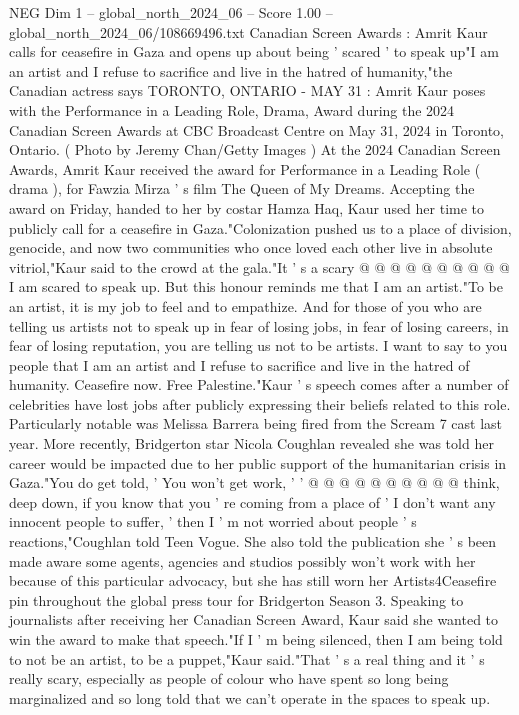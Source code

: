 \begin{textsample}{NEG Dim 1 – global\_north\_2024\_06 – Score 1.00 – global\_north\_2024\_06/108669496.txt}  \label{ex:f1_neg_140}
Canadian Screen Awards : Amrit Kaur calls for ceasefire in Gaza and opens up about being ' scared ' to speak up"I am an artist and I refuse to sacrifice and live in the hatred of humanity,"the Canadian actress says TORONTO, ONTARIO - MAY 31 : Amrit Kaur poses with the Performance in a Leading Role, Drama, Award during the 2024 Canadian Screen Awards at CBC Broadcast Centre on May 31, 2024 in Toronto, Ontario. ( Photo by Jeremy Chan/Getty Images ) At the 2024 Canadian Screen Awards, Amrit Kaur received the award for Performance in a Leading Role ( drama ), for Fawzia Mirza ' s film The Queen of My Dreams.
Accepting the award on Friday, handed to her by costar Hamza Haq, Kaur used her time to publicly call for a ceasefire in Gaza."Colonization pushed us to a place of division, genocide, and now two communities who once loved each other live in absolute vitriol,"Kaur said to the crowd at the gala."It ' s a scary @ @ @ @ @ @ @ @ @ @ I am scared to speak up.
But this honour reminds me that I am an artist."To be an artist, it is my job to feel and to empathize.
And for those of you who are telling us artists not to speak up in fear of losing jobs, in fear of losing careers, in fear of losing reputation, you are telling us not to be artists.
I want to say to you people that I am an artist and I refuse to sacrifice and live in the hatred of humanity.
Ceasefire now.
Free Palestine."Kaur ' s speech comes after a number of celebrities have lost jobs after publicly expressing their beliefs related to this role.
Particularly notable was Melissa Barrera being fired from the Scream 7 cast last year.
More recently, Bridgerton star Nicola Coughlan revealed she was told her career would be impacted due to her public support of the humanitarian crisis in Gaza."You do get told, ' You won't get work, ' ' @ @ @ @ @ @ @ @ @ @ think, deep down, if you know that you ' re coming from a place of ' I don't want any innocent people to suffer, ' then I ' m not worried about people ' s reactions,"Coughlan told Teen Vogue.
She also told the publication she ' s been made aware some agents, agencies and studios possibly won't work with her because of this particular advocacy, but she has still worn her Artists4Ceasefire pin throughout the global press tour for Bridgerton Season 3.
Speaking to journalists after receiving her Canadian Screen Award, Kaur said she wanted to win the award to make that speech."If I ' m being silenced, then I am being told to not be an artist, to be a puppet,"Kaur said."That ' s a real thing and it ' s really scary, especially as people of colour who have spent so long being marginalized and so long told that we can't operate in the spaces to speak up.

\end{textsample}
